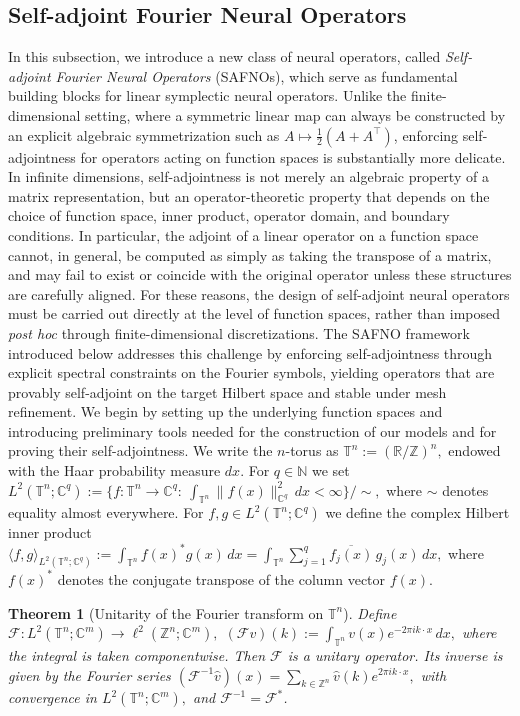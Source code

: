 \documentclass{article}
\theoremstyle{plain}
\newtheorem{theorem}{Theorem}[section]
\theoremstyle{definition}
\theoremstyle{remark}
\newcommand{\inner}[2]{\langle #1, #2 \rangle}
\newcommand{\F}{\mathcal{F}}
\newcommand{\Finve}{\mathcal{F}^{-1}}
\begin{document}
\subsection{Self-adjoint Fourier Neural Operators}
In this subsection, we introduce a new class of neural operators, called
\emph{Self-adjoint Fourier Neural Operators} (SAFNOs),
which serve as fundamental building blocks for linear symplectic neural operators.
Unlike the finite-dimensional setting, where a symmetric linear map can
always be constructed by an explicit algebraic symmetrization such as
$A \mapsto \tfrac12(A + A^\top)$, enforcing self-adjointness for operators acting on
function spaces is substantially more delicate.
In infinite dimensions, self-adjointness is not merely an algebraic property of a matrix
representation, but an operator-theoretic property that depends on the choice of function
space, inner product, operator domain, and boundary conditions.
In particular, the adjoint of a linear operator on a function space cannot, in general,
be computed as simply as taking the transpose of a matrix, and may fail to exist or coincide
with the original operator unless these structures are carefully aligned.
For these reasons, the design of self-adjoint neural operators must be carried out directly
at the level of function spaces, rather than imposed \emph{post hoc} through
finite-dimensional discretizations.
The SAFNO framework introduced below addresses this challenge by enforcing self-adjointness
through explicit spectral constraints on the Fourier symbols, yielding operators that are
provably self-adjoint on the target Hilbert space and stable under mesh refinement.
We begin by setting up the underlying function spaces and introducing preliminary tools
needed for the construction of our models and for proving their self-adjointness.
We write the $n$-torus as
\(
\mathbb{T}^n := (\mathbb{R}/\mathbb{Z})^n,
\)
endowed with the Haar probability measure $dx$.
For $q\in\mathbb{N}$ we set
\(
L^2(\mathbb{T}^n;\mathbb{C}^q)
:=\Big\{f:\mathbb{T}^n\to\mathbb{C}^q:\ \int_{\mathbb{T}^n}\|f(x)\|_{\mathbb{C}^q}^2\,dx<\infty\Big\}/\sim,
\)
where $\sim$ denotes equality almost everywhere.
For $f,g\in L^2(\mathbb{T}^n;\mathbb{C}^q)$ we define the complex Hilbert inner product
\(
\inner{f}{g}_{L^2(\mathbb{T}^n;\mathbb{C}^q)}
:=\int_{\mathbb{T}^n} f(x)^* g(x)\,dx
=\int_{\mathbb{T}^n}\sum_{j=1}^q \overline{f_j(x)}\,g_j(x)\,dx,
\)
where $f(x)^*$ denotes the conjugate transpose of the column vector $f(x)$.
\fi
\begin{theorem}[Unitarity of the Fourier transform on $\mathbb{T}^n$]\label{uf}
Define
\(
\F:L^2(\mathbb{T}^n;\mathbb{C}^m)\to \ell^2(\mathbb{Z}^n;\mathbb{C}^m),\)
\(
(\F v)(k):=\int_{\mathbb{T}^n} v(x)e^{-2\pi i k\cdot x}\,dx,
\)
where the integral is taken componentwise.
Then $\F$ is a unitary operator. Its inverse is given by the Fourier series
\(
(\Finve \hat v)(x)=\sum_{k\in\mathbb{Z}^n}\hat v(k)e^{2\pi i k\cdot x},
\)
with convergence in 
\(L^2(\mathbb{T}^n;\mathbb{C}^m),
\)
and $\Finve=\F^*$.
\end{theorem}
\end{document}
